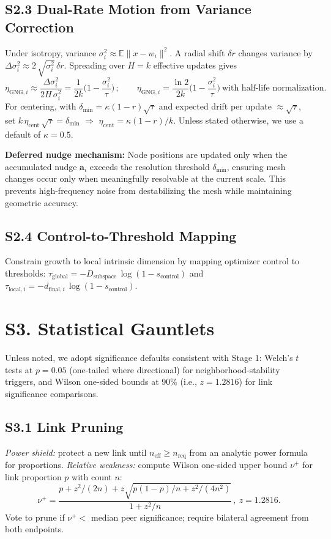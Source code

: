 \documentclass[11pt]{article}
\begin{document}
\subsection*{S2.3 Dual-Rate Motion from Variance Correction}
Under isotropy, variance $\sigma_i^2\approx\mathbb E\lVert x{-}w_i\rVert^2$. A radial shift $\delta r$ changes variance by $\Delta\sigma_i^2 \approx 2\,\sqrt{\sigma_i^2}\,\delta r$. Spreading over $H{=}k$ effective updates gives
\[\eta_{\mathrm{GNG},i} \approx \frac{\Delta\sigma_i^2}{2H\,\sigma_i^2} = \frac{1}{2k}\Big(1-\frac{\sigma_i^2}{\tau}\Big)\,;\qquad \eta_{\mathrm{GNG},i}=\frac{\ln 2}{2k}\Big(1-\frac{\sigma_i^2}{\tau}\Big)\ \text{with half-life normalization}.\]
For centering, with $\delta_{\min}=\kappa(1{-}r)\sqrt{\tau}$ and expected drift per update $\approx\sqrt{\tau}$, set $k\,\eta_{\mathrm{cent}}\,\sqrt{\tau}=\delta_{\min}$ $\Rightarrow$ $\eta_{\mathrm{cent}}=\kappa(1{-}r)/k$. Unless stated otherwise, we use a default of $\kappa=0.5$.

\textbf{Deferred nudge mechanism:} Node positions are updated only when the accumulated nudge $\mathbf{a}_i$ exceeds the resolution threshold $\delta_{\min}$, ensuring mesh changes occur only when meaningfully resolvable at the current scale. This prevents high-frequency noise from destabilizing the mesh while maintaining geometric accuracy.

\subsection*{S2.4 Control-to-Threshold Mapping}
Constrain growth to local intrinsic dimension by mapping optimizer control to thresholds: $\tau_{\mathrm{global}}= -D_{\mathrm{subspace}}\,\log(1{-}s_{\mathrm{control}})$ and $\tau_{\mathrm{local},i}= -d_{\mathrm{final},i}\,\log(1{-}s_{\mathrm{control}})$.

\section*{S3. Statistical Gauntlets}
Unless noted, we adopt significance defaults consistent with Stage 1: Welch's $t$ tests at $p{=}0.05$ (one-tailed where directional) for neighborhood-stability triggers, and Wilson one-sided bounds at 90\% (i.e., $z{=}1.2816$) for link significance comparisons.
\subsection*{S3.1 Link Pruning}
\emph{Power shield:} protect a new link until $n_{\mathrm{eff}}\ge n_{\mathrm{req}}$ from an analytic power formula for proportions. \emph{Relative weakness:} compute Wilson one-sided upper bound $\nu^+$ for link proportion $p$ with count $n$:
\[\nu^+ = \frac{ p + z^2/(2n) + z\sqrt{p(1-p)/n + z^2/(4n^2)} }{1+z^2/n}\,,\ z{=}1.2816.\]
Vote to prune if $\nu^+{<}$ median peer significance; require bilateral agreement from both endpoints.
\end{document}
